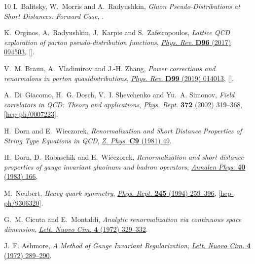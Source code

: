 \documentclass[12pt]{article}
\numberwithin{equation}{section}
\newcommand{\1}[1]{\mathbf{1}^{#1}}
\newcommand{\2}[1]{\mathbf{2}^{#1}}
\newcommand{\3}[1]{\mathbf{3}^{#1}}
\newcommand{\4}[1]{\mathbf{4}^{#1}}
\newcommand{\5}[1]{\mathbf{5}^{#1}}
\begin{document}
\begin{thebibliography}{10}
I.~Balitsky, W.~Morris and A.~Radyushkin, \emph{{Gluon Pseudo-Distributions at
  Short Distances: Forward Case}},
  \href{https://arxiv.org/abs/1910.13963}{{}}.

K.~Orginos, A.~Radyushkin, J.~Karpie and S.~Zafeiropoulos, \emph{{Lattice QCD
  exploration of parton pseudo-distribution functions}},
  \href{http://dx.doi.org/10.1103/PhysRevD.96.094503}{\emph{Phys. Rev.}
  {\bfseries D96} (2017) 094503},
  [\href{https://arxiv.org/abs/1706.05373}{{}}].

V.~M. Braun, A.~Vladimirov and J.-H. Zhang, \emph{{Power corrections and
  renormalons in parton quasidistributions}},
  \href{http://dx.doi.org/10.1103/PhysRevD.99.014013}{\emph{Phys. Rev.}
  {\bfseries D99} (2019) 014013},
  [\href{https://arxiv.org/abs/1810.00048}{{}}].

A.~Di~Giacomo, H.~G. Dosch, V.~I. Shevchenko and {\relax Yu}.~A. Simonov,
  \emph{{Field correlators in QCD: Theory and applications}},
  \href{http://dx.doi.org/10.1016/S0370-1573(02)00140-0}{\emph{Phys. Rept.}
  {\bfseries 372} (2002) 319--368},
  [\href{https://arxiv.org/abs/hep-ph/0007223}{{\ttfamily hep-ph/0007223}}].

H.~Dorn and E.~Wieczorek, \emph{{Renormalization and Short Distance Properties
  of String Type Equations in {QCD}}},
  \href{http://dx.doi.org/10.1007/BF01554111}{\emph{Z. Phys.} {\bfseries C9}
  (1981) 49}.

H.~Dorn, D.~Robaschik and E.~Wieczorek, \emph{{Renormalization and short
  distance properties of gauge invariant gluoinum and hadron operators}},
  \href{http://dx.doi.org/10.1002/andp.19834950208}{\emph{Annalen Phys.}
  {\bfseries 40} (1983) 166}.

M.~Neubert, \emph{{Heavy quark symmetry}},
  \href{http://dx.doi.org/10.1016/0370-1573(94)90091-4}{\emph{Phys. Rept.}
  {\bfseries 245} (1994) 259--396},
  [\href{https://arxiv.org/abs/hep-ph/9306320}{{\ttfamily hep-ph/9306320}}].

G.~M. Cicuta and E.~Montaldi, \emph{{Analytic renormalization via continuous
  space dimension}}, \href{http://dx.doi.org/10.1007/BF02756527}{\emph{Lett.
  Nuovo Cim.} {\bfseries 4} (1972) 329--332}.

J.~F. Ashmore, \emph{{A Method of Gauge Invariant Regularization}},
  \href{http://dx.doi.org/10.1007/BF02824407}{\emph{Lett. Nuovo Cim.}
  {\bfseries 4} (1972) 289--290}.


\end{thebibliography}
\end{document}
